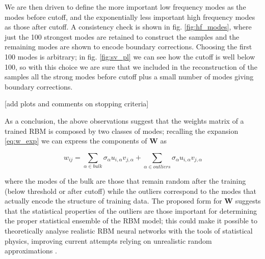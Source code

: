 \documentclass[notitlepage]{revtex4-1}
\begin{document}
We are then driven to define the more important low frequency modes as the modes before cutoff, and the exponentially less important high frequency modes as those after cutoff. A consistency check is shown in fig. \ref{fig:hf_modes}, where just the 100 strongest modes are retained to construct the samples and the remaining modes are shown to encode boundary corrections. Choosing the first 100 modes is arbitrary; in fig. \ref{fig:sv_pl} we can see how the cutoff is well below 100, so with this choice we are sure that we included in the reconstruction of the samples all the strong modes before cutoff plus a small number of modes giving boundary corrections.

[add plots and comments on stopping criteria]

As a conclusion, the above observations suggest that the weights matrix of a trained RBM is composed by two classes of modes; recalling the expansion \eqref{eq:w_exp} we can express the components of \(\mathbf{W}\) as

\begin{equation}
w_{ij} = \sum_{\alpha \in bulk} \sigma_{\alpha} u_{i,\alpha} v_{j,\alpha} + \sum_{\alpha \in outliers} \sigma_{\alpha} u_{i,\alpha} v_{j,\alpha}
\label{eq:params_exp}
\end{equation}

where the modes of the bulk are those that remain random after the training (below threshold or after cutoff) while the outliers correspond to the modes that actually encode the structure of training data. The proposed form for \(\mathbf{W}\) suggests that the statistical properties of the outliers are those important for determining the proper statistical ensemble of the RBM model; this could make it possible to theoretically analyse realistic RBM neural networks with the tools of statistical physics, improving current attempts relying on unrealistic random approximations \cite{monasson}.
\end{document}
